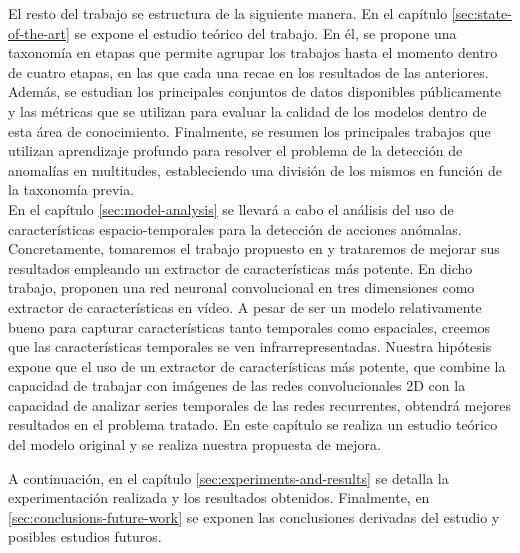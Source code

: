 \documentclass[../main.tex]{book}
\begin{document}
El resto del trabajo se estructura de la siguiente manera. En el
capítulo \ref{sec:state-of-the-art} se expone el estudio teórico del
trabajo. En él, se propone una taxonomía en etapas que permite agrupar
los trabajos hasta el momento dentro de cuatro etapas, en las que cada
una recae en los resultados de las anteriores. Además, se estudian los
principales conjuntos de datos disponibles públicamente y las métricas
que se utilizan para evaluar la calidad de los modelos dentro de esta
área de conocimiento. Finalmente, se resumen los principales trabajos
que utilizan aprendizaje profundo para resolver el problema de la
detección de anomalías en multitudes, estableciendo una división de los
mismos en función de la taxonomía previa.\\

En el capítulo \ref{sec:model-analysis} se llevará a cabo el análisis
del uso de características espacio-temporales para la detección de
acciones anómalas. Concretamente, tomaremos el trabajo propuesto en
\cite{sultani2018real} y trataremos de mejorar sus resultados
empleando un extractor de características más potente. En dicho
trabajo, proponen una red neuronal convolucional en tres dimensiones
como extractor de características en vídeo. A pesar de ser un modelo
relativamente bueno para capturar características tanto temporales
como espaciales, creemos que las características temporales se ven
infrarrepresentadas. Nuestra hipótesis expone que el uso de un
extractor de características más potente, que combine la capacidad de
trabajar con imágenes de las redes convolucionales 2D con la capacidad
de analizar series temporales de las redes recurrentes, obtendrá
mejores resultados en el problema tratado. En este capítulo se realiza
un estudio teórico del modelo original y se realiza nuestra propuesta
de mejora.

A continuación, en el capítulo \ref{sec:experiments-and-results} se
detalla la experimentación realizada y los resultados
obtenidos. Finalmente, en \ref{sec:conclusions-future-work} se exponen
las conclusiones derivadas del estudio y posibles estudios futuros.
\end{document}
